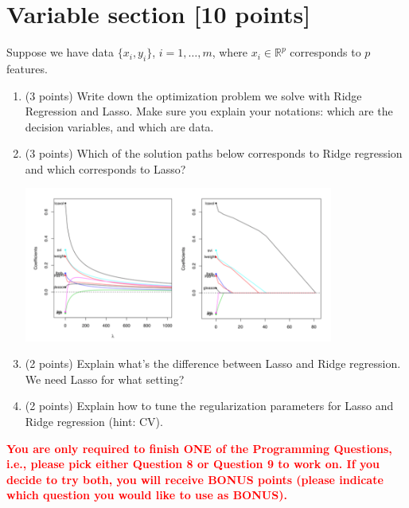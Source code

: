 \documentclass[a4paper,12pt,fleqn]{article}
\begin{document}
\clearpage

\section{Variable section [10 points]}

Suppose we have data $\{x_i, y_i\}$, $i = 1, \ldots, m$, where $x_i \in \mathbb R^p$ corresponds to $p$ features.


\begin{enumerate}
\item (3 points) Write down the optimization problem we solve with Ridge Regression and Lasso. Make sure you explain your notations: which are the decision variables, and which are data. 

\vspace{1.5in}


\item (3 points) Which of the solution paths below corresponds to Ridge regression and which corresponds to Lasso?
%
\begin{center}
\includegraphics[width = 0.8\textwidth]{./fig/path}
\end{center}

\vspace{0.3in}

\item (2 points) Explain what's the difference between Lasso and Ridge regression. We need Lasso for what setting?

\vspace{0.9in}

\item (2 points) Explain how to tune the regularization parameters for Lasso and Ridge regression (hint: CV). 

\vspace{1.5in}

\end{enumerate}


\clearpage 

\textcolor{red}{\bf
You are only required to finish ONE of the Programming Questions, i.e., please pick either Question 8 or Question 9 to work on. If you decide to try both, you will receive BONUS points (please indicate which question you would like to use as BONUS).
}
\end{document}
